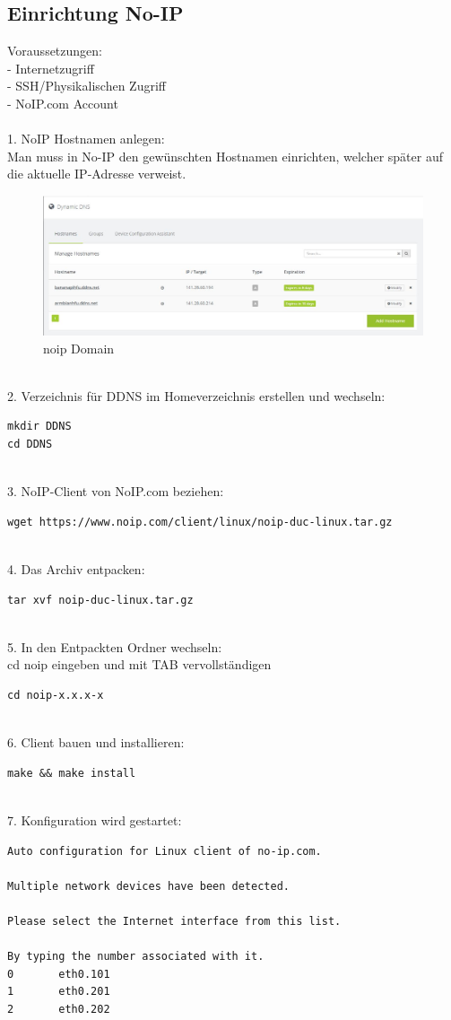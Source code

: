 \subsection{Einrichtung No-IP}
Voraussetzungen:\\
- Internetzugriff\\
- SSH/Physikalischen Zugriff\\
- NoIP.com Account\\
\\
1. NoIP Hostnamen anlegen:\\
Man muss in No-IP den gewünschten Hostnamen einrichten, welcher später auf die aktuelle IP-Adresse verweist.\\
\begin{figure}[ht]
\includegraphics[width=\textwidth]{pictures/Jonas/noip_Domain}
\caption{noip Domain}
\end{figure}
~\\
2. Verzeichnis für DDNS im Homeverzeichnis erstellen und wechseln:
\begin{lstlisting}
mkdir DDNS
cd DDNS
\end{lstlisting}
~\\
3. NoIP-Client von NoIP.com beziehen:
\begin{lstlisting}
wget https://www.noip.com/client/linux/noip-duc-linux.tar.gz
\end{lstlisting}
~\\
4. Das Archiv entpacken:
\begin{lstlisting}
tar xvf noip-duc-linux.tar.gz
\end{lstlisting}
~\\
5. In den Entpackten Ordner wechseln:\\
cd noip eingeben und mit TAB vervollständigen
\begin{lstlisting}
cd noip-x.x.x-x 
\end{lstlisting}
~\\
6. Client bauen und installieren:
\begin{lstlisting}
make && make install
\end{lstlisting}
~\\
7. Konfiguration wird gestartet:
\begin{lstlisting}
Auto configuration for Linux client of no-ip.com.

Multiple network devices have been detected.

Please select the Internet interface from this list.

By typing the number associated with it.
0       eth0.101
1       eth0.201
2       eth0.202
\end{lstlisting}

